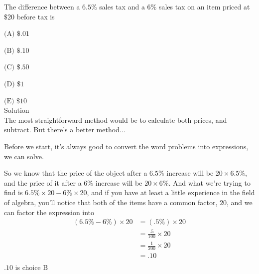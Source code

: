 

The difference between a $6.5\%$ sales tax and a $6\%$ sales tax on an item priced at $\$20$ before tax is

$\text{(A)}$ $\$.01$

$\text{(B)}$ $\$.10$

$\text{(C)}$ $\$ .50$

$\text{(D)}$ $\$ 1$

$\text{(E)}$ $\$10$
\\
Solution
\\
The most straightforward method would be to calculate both prices, and subtract. But there's a better method...

Before we start, it's always good to convert the word problems into expressions, we can solve.

So we know that the price of the object after a $6.5\%$ increase will be $20 \times 6.5\%$, and the price of it after a $6\%$ increase will be $20 \times 6\%$. And what we're trying to find is $6.5\% \times 20 - 6\% \times 20$, and if you have at least a little experience in the field of algebra, you'll notice that both of the items have a common factor, $20$, and we can factor the expression into \begin{align*} (6.5\% - 6\% ) \times 20 &= (.5\% )\times 20 \\ &= \frac{.5}{100}\times 20 \\ &= \frac{1}{200}\times 20 \\ &= .10 \\ \end{align*}
$.10$ is choice $\boxed{\text{B}}$
